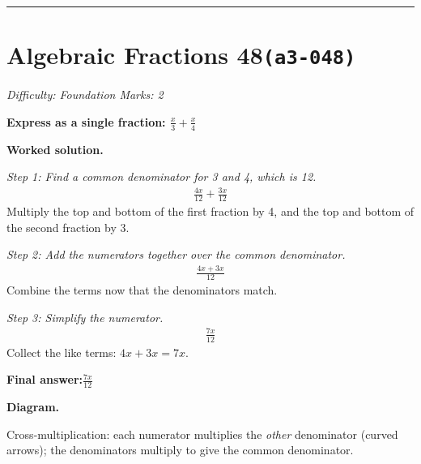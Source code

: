 \documentclass[11pt]{article}
\newcommand{\question}[1]{\par\medskip\noindent\textbf{#1}\par}
\begin{document}
\medskip\hrule

\section*{Algebraic Fractions 48\quad\small\texttt{(a3-048)}}
\textit{Difficulty: Foundation \quad\textbar\quad Marks: 2}

\question{Express as a single fraction: \( \frac{x}{3} + \frac{x}{4} \)}

\textbf{Worked solution.}

\textit{Step 1: Find a common denominator for 3 and 4, which is 12.}
\[\begin{gathered}
\frac{4x}{12} + \frac{3x}{12}
\end{gathered}\]
Multiply the top and bottom of the first fraction by 4, and the top and bottom of the second fraction by 3.

\textit{Step 2: Add the numerators together over the common denominator.}
\[\begin{gathered}
\frac{4x + 3x}{12}
\end{gathered}\]
Combine the terms now that the denominators match.

\textit{Step 3: Simplify the numerator.}
\[\begin{gathered}
\frac{7x}{12}
\end{gathered}\]
Collect the like terms: \( 4x + 3x = 7x \).

\begin{answerbox}
\textbf{Final answer:}\quad \(\displaystyle \frac{7x}{12}\)
\end{answerbox}
\textbf{Diagram.}

\begin{center}
\end{center}
\small Cross-multiplication: each numerator multiplies the \emph{other} denominator (curved arrows); the denominators multiply to give the common denominator.\normalsize
\end{document}
